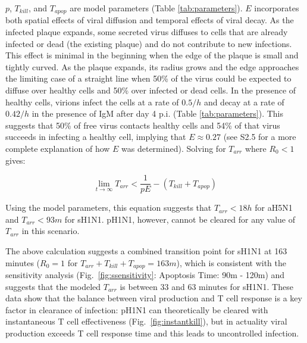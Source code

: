 \documentclass[preprint,10pt,numbers]{elsarticle}
\begin{document}

$p$, $T_{kill}$, and $T_{apop}$ are model parameters (Table \ref{tab:parameters}).  $E$ incorporates both spatial effects of viral diffusion and temporal effects of viral decay.  As the infected plaque expands, some secreted virus diffuses to cells that are already infected or dead (the existing plaque) and do not contribute to new infections.  This effect is minimal in the beginning when the edge of the plaque is small and tightly curved.  As the plaque expands, its radius grows and the edge approaches the limiting case of a straight line when 50\% of the virus could be expected to diffuse over healthy cells and 50\% over infected or dead cells.  In the presence of healthy cells, virions infect the cells at a rate of $0.5/h$ and decay at a rate of $0.42/h$ in the presence of IgM after day 4 p.i.  (Table \ref{tab:parameters}).  This suggests that 50\% of free virus contacts healthy cells and 54\% of that virus succeeds in infecting a healthy cell, implying that $E \approx 0.27$ (see S2.5 for a more complete explanation of how $E$ was determined).  Solving for $T_{arr}$ where $R_0 < 1$ gives:

\begin{equation*}
\lim_{t \to \infty} T_{arr} < \frac{1}{pE} - (T_{kill} + T_{apop})
\tag{Eq. 4}
\end{equation*}

Using the model parameters, this equation suggests that $T_{arr} < 18h$ for aH5N1 and $T_{arr} < 93m$ for sH1N1.  pH1N1, however, cannot be cleared for any value of $T_{arr}$ in this scenario.  

The above calculation suggests a combined transition point for sH1N1 at 163 minutes ($R_0 = 1$ for $T_{arr}+T_{kill}+T_{apop}=163m$), which is consistent with the sensitivity analysis (Fig.~\ref{fig:ssensitivity}: Apoptosis Time: 90m - 120m) and suggests that the modeled $T_{arr}$ is between 33 and 63 minutes for sH1N1.  These data show that the balance between viral production and T cell response is a key factor in clearance of infection: pH1N1 can theoretically be cleared with instantaneous T cell effectiveness (Fig.~\ref{fig:instantkill}), but in actuality viral production exceeds T cell response time and this leads to uncontrolled infection.
\end{document}
